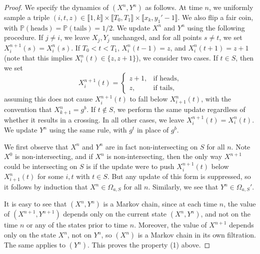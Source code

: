\begin{proof}
	We specify the dynamics of $(X^n, Y^n)$ as follows. At time $n$, we uniformly sample a triple $(i,t,z)\in \llbracket 1, k\rrbracket \times \llbracket T_0, T_1\rrbracket \times \llbracket x_k,y_1'-1\rrbracket$. We also flip a fair coin, with $\mathbb{P}(\textrm{heads})=\mathbb{P}(\textrm{tails})=1/2$. We update $X^n$ and $Y^n$ using the following procedure. If $j\neq i$, we leave $X_j,Y_j$ unchanged, and for all points $s\neq t$, we set $X^{n+1}_i(s) = X^n_i(s)$. If $T_0 < t < T_1$, $X^n_i(t-1)=z$, and $X^n_i(t+1)=z+1$ (note that this implies $X^n_i(t)\in\{z,z+1\}$), we consider two cases. If $t \in S$, then we set
	\[
	X^{n+1}_i(t) = \begin{cases}
	z+1, & \textrm{if heads},\\
	z, & \textrm{if tails},
	\end{cases}
	\]
	assuming this does not cause $X^{n+1}_i(t)$ to fall below $X^n_{i+1}(t)$, with the convention that $X^n_{k+1} = g^b$. If $t\notin S$, we perform the same update regardless of whether it results in a crossing. In all other cases, we leave $X^{n+1}_i(t)=X^n_i(t)$. We update $Y^n$ using the same rule, with $g^t$ in place of $g^b$.
	
	We first observe that $X^n$ and $Y^n$ are in fact non-intersecting on $S$ for all $n$. Note $X^0$ is non-intersecting, and if $X^n$ is non-intersecting, then the only way $X^{n+1}$ could be intersecting on $S$ is if the update were to push $X^{n+1}_i(t)$ below $X^n_{i+1}(t)$ for some $i,t$ with $t\in S$. But any update of this form is suppressed, so it follows by induction that $X^n\in\Omega_{a,S}$ for all $n$. Similarly, we see that $Y^n\in\Omega_{a,S}'$.
	
	It is easy to see that $(X^n,Y^n)$ is a Markov chain, since at each time $n$, the value of $(X^{n+1},Y^{n+1})$ depends only on the current state $(X^n,Y^n)$, and not on the time $n$ or any of the states prior to time $n$. Moreover, the value of $X^{n+1}$ depends only on the state $X^n$, not on $Y^n$, so $(X^n)$ is a Markov chain in its own filtration. The same applies to $(Y^n)$. This proves the property (1) above.
	

\end{proof}
